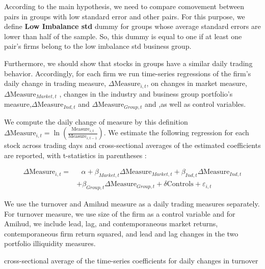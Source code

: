 \documentclass[12pt, a4paper]{article}
\begin{document}
According to the main hypothesis, we need to compare comovement between pairs in groups with low standard error and other pairs.
 For this purpose, we define \textbf{Low Imbalance std} dummy for groups whose average standard errors are lower than half of the sample. 
So, this dummy is equal to one if at least one pair's firms belong to the low imbalance std business group.
\begin{table}[htbp]
	\centering
	\resizebox{\textwidth}{!}{
		
	}
\end{table}
\FloatBarrier

Furthermore, we should show that stocks in groups have a similar daily trading behavior. Accordingly, for each firm we run time-series regressions of the firm's daily change in trading measure, $ \Delta \text{Measure}_{i,t} $, on changes in market measure,$ \Delta\text{Measure}_{Market,t}   $ , changes in the industry and business group portfolio's measure,$ \Delta\text{Measure}_{Ind,t} $ and  $\Delta \text{Measure}_{Group,t} $ and  ,as well as control variables.

 We compute the daily change of measure by this definition $ \Delta \text{Measure}_{i,t} = \ln(\frac{\text{Measure}_{i,t}}{\text{Measure}_{i,t-1}}) $. 
We estimate the following regression for each stock across trading days and cross-sectional averages of the estimated coefficients are reported, with t-statistics in parentheses :

\begin{equation*}
	\begin{split}
			\Delta \text{Measure}_{i,t} =  & \text{	}\alpha + \beta_{Market,t} \Delta \text{Measure}_{Market,t}  
		+ \beta_{Ind,t} \Delta \text{Measure}_{Ind,t} \\ & + \beta_{Group,t} \Delta \text{Measure}_{Group,t} + \delta\text{Controls} + \varepsilon_{i,t}
	\end{split}
\end{equation*}

We use the turnover and Amihud measure as a daily trading measures separately. For turnover measure, we use size of the firm as a control variable and for Amihud, we include lead, lag, and contemporaneous market returns, contemporaneous firm return squared, and lead and lag changes in the two portfolio illiquidity measures.

	\begin{table}[htbp]
	\centering
	\caption{cross-sectional average of the time-series coefficients for daily changes in turnover }
	\resizebox{0.6\textheight}{!}{
		
	}
\end{table}
\end{document}
